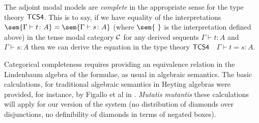 \begin{theorem}
\label{thm:tcs4-completeness}
The adjoint modal models are \textit{complete} in the appropriate
sense for the type theory $\sf{TCS4}$. This is to say, if we have
equality of the interpretations $\sem{\Gamma \vdash t \colon A} =
\sem{\Gamma \vdash s \colon A}$ (where \mbox{$\sem{\ } $} is the
interpretation defined above) in the tense modal category $\cal C$ for
any derived sequents $\Gamma \vdash t \colon A$ and $\Gamma \vdash s
\colon A$ then we can derive the equation in the type theory
$\sf{TCS4}$ $\;$ $\Gamma \vdash t = s \colon A$.
\end{theorem}
Categorical completeness requires providing an equivalence relation in
the Lindenbaum algebra of the formulae, as usual in algebraic
semantics. The basic calculations, for traditional algebraic semantics
in Heyting algebras were provided, for instance, by Figallo et al in
\cite{figallo2014}. \textit{Mutatis mutantis} these calculations will
apply for our version of the system (no distribution of diamonds over
disjunctions, no definibility of diamonds in terms of negated boxes).
